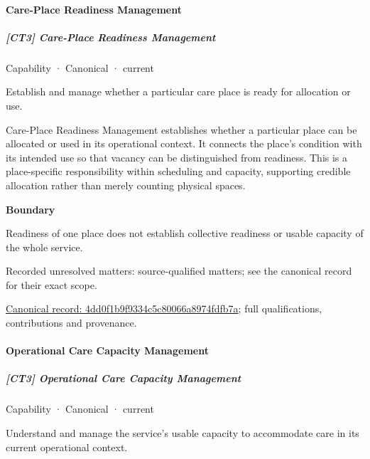 \paragraph{Care-Place Readiness Management}

\subparagraph{[CT3] Care-Place Readiness Management}

\label{element:4dd0f1b9f9334c5c80066a8974fdfb7a}
{\small Capability · Canonical · current}\par

Establish and manage whether a particular care place is ready for allocation or use.



Care-Place Readiness Management establishes whether a particular place can be allocated or used in its operational context. It connects the place's condition with its intended use so that vacancy can be distinguished from readiness. This is a place-specific responsibility within scheduling and capacity, supporting credible allocation rather than merely counting physical spaces.



\textbf{Boundary}



Readiness of one place does not establish collective readiness or usable capacity of the whole service.


{\small Recorded unresolved matters: source-qualified matters; see the canonical record for their exact scope.}\par
{\footnotesize \href{../../../../continuum/strategy/capability/4dd0f1b9f9334c5c80066a8974fdfb7a.md}{Canonical record: 4dd0f1b9f9334c5c80066a8974fdfb7a}; full qualifications, contributions and provenance.}\par
\paragraph{Operational Care Capacity Management}

\subparagraph{[CT3] Operational Care Capacity Management}

\label{element:3040519e1fec43699c14a3cafb2d945d}
{\small Capability · Canonical · current}\par

Understand and manage the service’s usable capacity to accommodate care in its current operational context.



